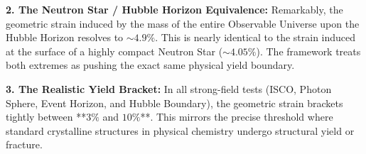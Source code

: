 \documentclass[11pt, letterpaper, openany]{book}
\begin{document}
\textbf{2. The Neutron Star / Hubble Horizon Equivalence:}
Remarkably, the geometric strain induced by the mass of the entire Observable Universe upon the Hubble Horizon resolves to $\sim 4.9\%$. This is nearly identical to the strain induced at the surface of a highly compact Neutron Star ($\sim 4.05\%$). The framework treats both extremes as pushing the exact same physical yield boundary.

\textbf{3. The Realistic Yield Bracket:}
In all strong-field tests (ISCO, Photon Sphere, Event Horizon, and Hubble Boundary), the geometric strain brackets tightly between **$3\%$ and $10\%$**. This mirrors the precise threshold where standard crystalline structures in physical chemistry undergo structural yield or fracture.

\vspace{0.5cm}
\begin{center}
\end{center}
\end{document}

